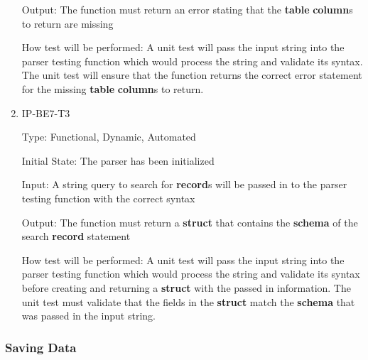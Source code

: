 \documentclass[12pt, titlepage]{article}
\begin{document}
\begin{enumerate}
Output: The function must return an error stating that the \textbf{table} \textbf{column}s to return are missing
					
How test will be performed: A unit test will pass the input string into the parser testing function which would process the string and validate its syntax. The unit test will ensure that the function returns the correct error statement for the missing \textbf{table} \textbf{column}s to return.

\item{IP-BE7-T3}

Type: Functional, Dynamic, Automated
					
Initial State: The parser has been initialized
					
Input: A string query to search for \textbf{record}s will be passed in to the parser testing function with the correct syntax
					
Output: The function must return a \textbf{struct} that contains the \textbf{schema} of the search \textbf{record} statement
					
How test will be performed: A unit test will pass the input string into the parser testing function which would process the string and validate its syntax before creating and returning a \textbf{struct} with the passed in information. The unit test must validate that the fields in the \textbf{struct} match the \textbf{schema} that was passed in the input string.

\end{enumerate}

\subsubsection{Saving Data}
\end{document}
